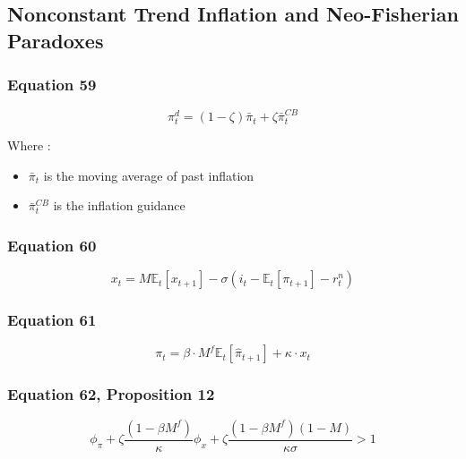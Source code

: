 \documentclass{article}
\begin{document}
\subsection{Nonconstant Trend Inflation and Neo-Fisherian Paradoxes}

\subsubsection*{Equation 59}

\begin{equation}\tag{59}
    \pi^{d}_{t}=(1-\zeta)\bar{\pi}_{t}+\zeta\bar{\pi}_{t}^{CB}
\end{equation}

Where : 
\begin{itemize}
    \item $\bar{\pi}_{t}$ is the moving average of past inflation 
    \item $\bar{\pi}_{t}^{CB}$ is the inflation guidance 
\end{itemize}

\subsubsection*{Equation 60}

\begin{equation}\tag{60}
    x_{t}=M\mathbb{E}_{t}\left[x_{t+1}\right]-\sigma\left(i_{t}-\mathbb{E}_{t}\left[\pi_{t+1}\right]-r^{n}_{t}\right)
\end{equation}

\subsubsection*{Equation 61}

\begin{equation}\tag{61}
    \pi_{t}=\beta\cdot M^{f} \mathbb{E}_t\left[\hat{\pi}_{t+1}\right]+\kappa\cdot x_{t}
\end{equation}

\subsubsection*{Equation 62, Proposition 12}

\begin{equation}\tag{62}
    \phi_{\pi}+\zeta \frac{(1-\beta M^{f})}{\kappa}\phi_{x}+\zeta\frac{(1-\beta M^{f})(1-M)}{\kappa \sigma}>1
\end{equation}
\end{document}
